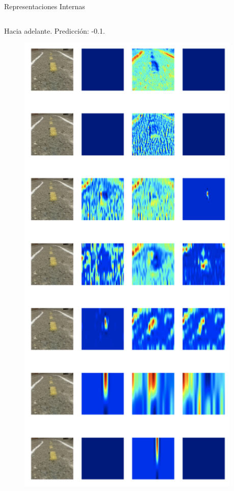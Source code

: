 \documentclass[10pt]{beamer}
\begin{document}
\begin{frame}{Representaciones Internas}
\begin{columns}
        \begin{column}{0.31\textwidth}
            Hacia adelante. Predicción: \alert{-0.1}.
            \begin{figure}[!h] 
                \centering
                \includegraphics[width=0.95\textwidth]{../img/predade}
            \end{figure}
        \end{column}
        

\end{columns}
\end{frame}
\end{document}
